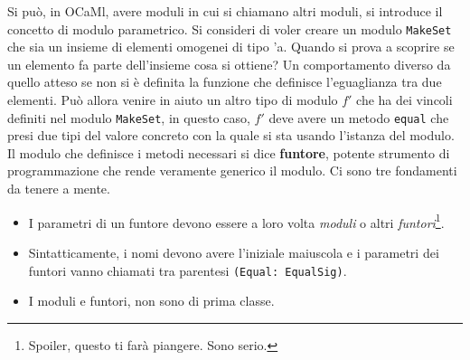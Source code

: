 \documentclass{article}
\begin{document}
\vspace*{0.5cm}

\hspace*{0.5cm}Si può, in OCaMl, avere moduli in cui si chiamano altri moduli, si introduce il concetto di modulo parametrico.
Si consideri di voler creare un modulo \texttt{MakeSet} che sia un insieme di elementi omogenei di tipo 'a.
Quando si prova a scoprire se un elemento fa parte dell'insieme cosa si ottiene? Un comportamento diverso da quello atteso se non si è definita la funzione che definisce l'eguaglianza tra due elementi.
Può allora venire in aiuto un altro tipo di modulo $f'$ che ha dei vincoli definiti nel modulo \texttt{MakeSet}, in questo caso, $f'$ deve avere un metodo \texttt{equal} che presi due tipi del valore concreto con la quale si sta usando l'istanza del modulo.\newline
\hspace*{0.5cm}Il modulo che definisce i metodi necessari si dice \textbf{funtore}, potente strumento di programmazione che rende veramente generico il modulo.
Ci sono tre fondamenti da tenere a mente.

\begin{itemize}
  \item I parametri di un funtore devono essere a loro volta \textit{moduli} o altri \textit{funtori}\footnote{Spoiler, questo ti farà piangere. Sono serio.}.
  \item Sintatticamente, i nomi devono avere l'iniziale maiuscola e i parametri dei funtori vanno chiamati tra parentesi \texttt{(Equal: EqualSig)}.
  \item I moduli e funtori, non sono di prima classe.
\end{itemize}
\end{document}

